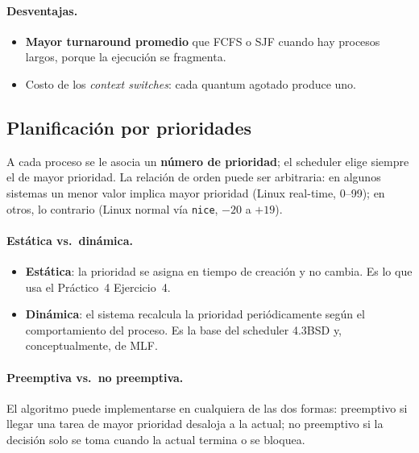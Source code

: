 \documentclass[11pt,a4paper]{article}
\begin{document}
\paragraph{Desventajas.}
\begin{itemize}[leftmargin=*,nosep]
    \item \textbf{Mayor turnaround promedio} que FCFS o SJF cuando hay
        procesos largos, porque la ejecución se fragmenta.
    \item Costo de los \emph{context switches}: cada quantum agotado
        produce uno.
\end{itemize}

\subsection{Planificación por prioridades}

\begin{definicion}
A cada proceso se le asocia un \textbf{número de prioridad}; el
scheduler elige siempre el de mayor prioridad. La relación de orden
puede ser arbitraria: en algunos sistemas un menor valor implica
mayor prioridad (Linux real-time, 0--99); en otros, lo contrario
(Linux normal vía \texttt{nice}, $-20$ a $+19$).
\end{definicion}

\paragraph{Estática vs.\ dinámica.}
\begin{itemize}[leftmargin=*,nosep]
    \item \textbf{Estática}: la prioridad se asigna en tiempo de
        creación y no cambia. Es lo que usa el Práctico~4 Ejercicio~4.
    \item \textbf{Dinámica}: el sistema recalcula la prioridad
        periódicamente según el comportamiento del proceso. Es la
        base del scheduler 4.3BSD y, conceptualmente, de MLF.
\end{itemize}

\paragraph{Preemptiva vs.\ no preemptiva.} El algoritmo puede
implementarse en cualquiera de las dos formas: preemptivo si llegar
una tarea de mayor prioridad desaloja a la actual; no preemptivo si
la decisión solo se toma cuando la actual termina o se bloquea.
\end{document}
